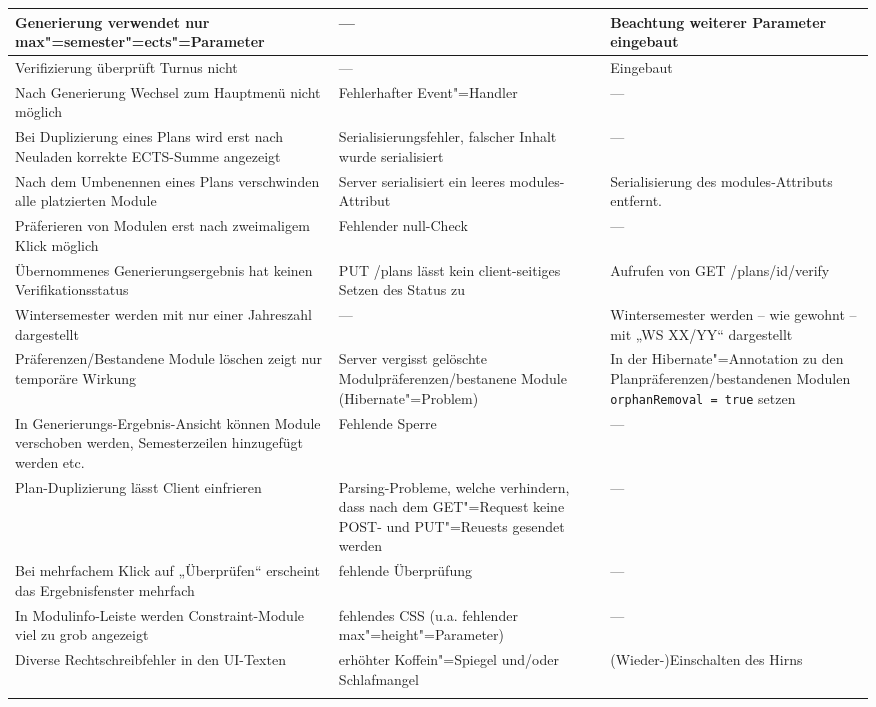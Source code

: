 \begin{longtable}{| >{\hspace{0pt}} p{} | >{\hspace{0pt}} p{} | >{\hspace{0pt}} p{} | }
	\hline
	Generierung verwendet nur max"=semester"=ects"=Parameter & --- & Beachtung weiterer Parameter eingebaut \\
	\hline
	Verifizierung überprüft Turnus nicht & --- & Eingebaut \\
	\hline
	Nach Generierung Wechsel zum Hauptmenü nicht möglich & Fehlerhafter Event"=Handler & --- \\
	\hline
	Bei Duplizierung eines Plans wird erst nach Neuladen korrekte ECTS-Summe angezeigt & Serialisierungsfehler, falscher Inhalt wurde serialisiert & --- \\
	\hline
	Nach dem Umbenennen eines Plans verschwinden alle platzierten Module & Server serialisiert ein leeres modules-Attribut & Serialisierung des modules-Attributs entfernt. \\
	\hline
	Präferieren von Modulen erst nach zweimaligem Klick möglich & Fehlender null-Check & --- \\
	\hline
	Übernommenes Generierungsergebnis hat keinen Verifikationsstatus & PUT /plans lässt kein client-seitiges Setzen des Status zu & Aufrufen von GET /plans/id/verify \\
	\hline
	Wintersemester werden mit nur einer Jahreszahl dargestellt & --- & Wintersemester werden – wie gewohnt – mit „WS XX/YY“ dargestellt \\
	\hline
	Präferenzen/Bestandene Module löschen zeigt nur temporäre Wirkung & Server vergisst gelöschte Modulpräferenzen/bestanene Module (Hibernate"=Problem) & In der Hibernate"=Annotation zu den Planpräferenzen/bestandenen Modulen \texttt{orphanRemoval = true} setzen \\
	\hline
	In Generierungs-Ergebnis-Ansicht können Module verschoben werden, Semesterzeilen hinzugefügt werden etc. & Fehlende Sperre & --- \\
	\hline
	Plan-Duplizierung lässt Client einfrieren & Parsing-Probleme, welche verhindern, dass nach dem GET"=Request keine POST- und PUT"=Reuests gesendet werden & --- \\
	\hline
	Bei mehrfachem Klick auf „Überprüfen“ erscheint das Ergebnisfenster mehrfach & fehlende Überprüfung & --- \\
	\hline
	In Modulinfo-Leiste werden Constraint-Module viel zu grob angezeigt & fehlendes CSS (u.a. fehlender max"=height"=Parameter) & --- \\
	\hline
	Diverse Rechtschreibfehler in den UI-Texten & erhöhter Koffein"=Spiegel und/oder Schlafmangel & (Wieder-)Einschalten des Hirns \\
	\hhline{|=|=|=|}
\end{longtable}
